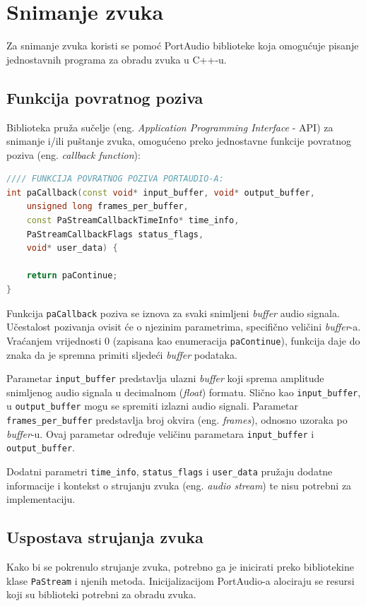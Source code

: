 \documentclass[times, utf8, diplomski, numeric]{fer}
\begin{document}
\section{Snimanje zvuka}
%
Za snimanje zvuka koristi se pomoć PortAudio\cite{portaudio} biblioteke koja omogućuje pisanje jednostavnih programa za obradu zvuka u C++-u.

\subsection{Funkcija povratnog poziva}
%
Biblioteka pruža sučelje (eng. \textit{Application Programming Interface} - API) za snimanje i/ili puštanje zvuka, omogućeno preko jednostavne funkcije povratnog poziva (eng. \textit{callback function}):

\begin{lstlisting}[language=C++, frame=single]
//// FUNKCIJA POVRATNOG POZIVA PORTAUDIO-A:
int paCallback(const void* input_buffer, void* output_buffer,
	unsigned long frames_per_buffer,
	const PaStreamCallbackTimeInfo* time_info,
	PaStreamCallbackFlags status_flags,
	void* user_data) {
	
	return paContinue;
}
\end{lstlisting}

Funkcija \verb|paCallback| poziva se iznova za svaki snimljeni \textit{buffer} audio signala. Učestalost pozivanja ovisit će o njezinim parametrima, specifično veličini \textit{buffer}-a. Vraćanjem vrijednosti 0 (zapisana kao enumeracija \verb|paContinue|), funkcija daje do znaka da je spremna primiti sljedeći \textit{buffer} podataka.

Parametar \verb|input_buffer| predstavlja ulazni \textit{buffer} koji sprema amplitude snimljenog audio signala u decimalnom (\textit{float}) formatu. Slično kao \verb|input_buffer|, u \verb|output_buffer| mogu se spremiti izlazni audio signali. Parametar \verb|frames_per_buffer| predstavlja broj okvira (eng. \textit{frames}), odnosno uzoraka po \textit{buffer}-u. Ovaj parametar određuje veličinu parametara \verb|input_buffer| i \verb|output_buffer|.

Dodatni parametri \verb|time_info|, \verb|status_flags| i \verb|user_data| pružaju dodatne informacije i kontekst o strujanju zvuka (eng. \textit{audio stream}) te nisu potrebni za implementaciju.

\subsection{Uspostava strujanja zvuka}
%
Kako bi se pokrenulo strujanje zvuka, potrebno ga je inicirati preko bibliotekine klase \verb|PaStream| i njenih metoda. Inicijalizacijom PortAudio-a alociraju se resursi koji su biblioteki potrebni za obradu zvuka.
\end{document}
